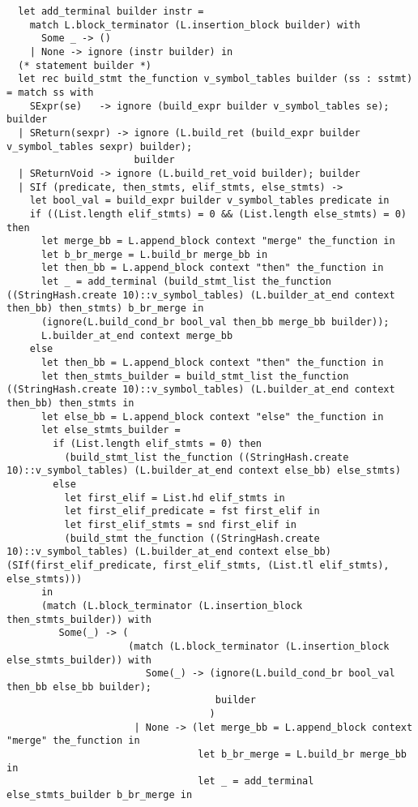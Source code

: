 \documentclass{article}
\begin{document}
\begin{verbatim}
  let add_terminal builder instr =
    match L.block_terminator (L.insertion_block builder) with
      Some _ -> ()
    | None -> ignore (instr builder) in
  (* statement builder *) 
  let rec build_stmt the_function v_symbol_tables builder (ss : sstmt) = match ss with
    SExpr(se)   -> ignore (build_expr builder v_symbol_tables se); builder
  | SReturn(sexpr) -> ignore (L.build_ret (build_expr builder v_symbol_tables sexpr) builder);
                      builder
  | SReturnVoid -> ignore (L.build_ret_void builder); builder
  | SIf (predicate, then_stmts, elif_stmts, else_stmts) ->
    let bool_val = build_expr builder v_symbol_tables predicate in
    if ((List.length elif_stmts) = 0 && (List.length else_stmts) = 0) then
      let merge_bb = L.append_block context "merge" the_function in
      let b_br_merge = L.build_br merge_bb in
      let then_bb = L.append_block context "then" the_function in
      let _ = add_terminal (build_stmt_list the_function ((StringHash.create 10)::v_symbol_tables) (L.builder_at_end context then_bb) then_stmts) b_br_merge in
      (ignore(L.build_cond_br bool_val then_bb merge_bb builder));
      L.builder_at_end context merge_bb
    else
      let then_bb = L.append_block context "then" the_function in
      let then_stmts_builder = build_stmt_list the_function ((StringHash.create 10)::v_symbol_tables) (L.builder_at_end context then_bb) then_stmts in
      let else_bb = L.append_block context "else" the_function in
      let else_stmts_builder =
        if (List.length elif_stmts = 0) then
          (build_stmt_list the_function ((StringHash.create 10)::v_symbol_tables) (L.builder_at_end context else_bb) else_stmts)
        else
          let first_elif = List.hd elif_stmts in
          let first_elif_predicate = fst first_elif in
          let first_elif_stmts = snd first_elif in
          (build_stmt the_function ((StringHash.create 10)::v_symbol_tables) (L.builder_at_end context else_bb) (SIf(first_elif_predicate, first_elif_stmts, (List.tl elif_stmts), else_stmts)))
      in
      (match (L.block_terminator (L.insertion_block then_stmts_builder)) with
         Some(_) -> (
                     (match (L.block_terminator (L.insertion_block else_stmts_builder)) with
                        Some(_) -> (ignore(L.build_cond_br bool_val then_bb else_bb builder);
                                    builder
                                   )
                      | None -> (let merge_bb = L.append_block context "merge" the_function in
                                 let b_br_merge = L.build_br merge_bb in
                                 let _ = add_terminal else_stmts_builder b_br_merge in

\end{verbatim}
\end{document}
